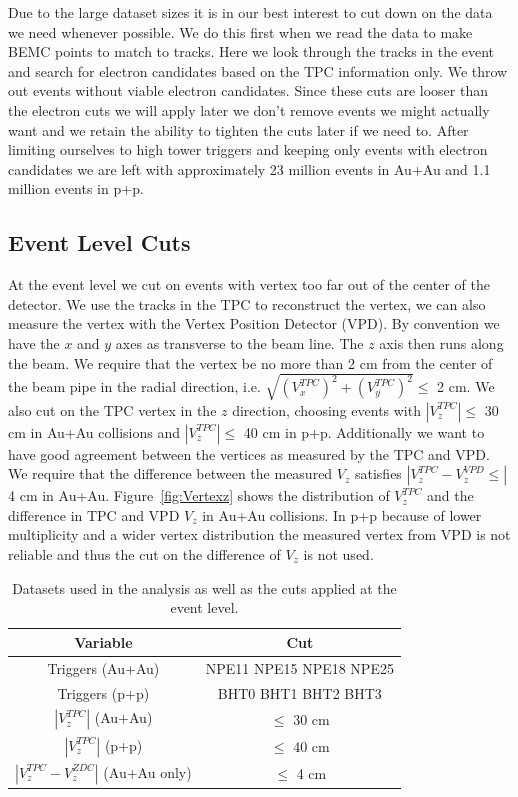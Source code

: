 Due to the large dataset sizes it is in our best interest to cut down on the data we need whenever possible. We do this first when we read the data to make BEMC points to match to tracks. Here we look through the tracks in the event and search for electron candidates based on the TPC information only. We throw out events without viable electron candidates. Since these cuts are looser than the electron cuts we will apply later we don't remove events we might actually want and we retain the ability to tighten the cuts later if we need to. After limiting ourselves to high tower triggers and keeping only events with electron candidates we are left with approximately 23 million events in Au+Au and 1.1 million events in p+p.

\subsection{Event Level Cuts}

At the event level we cut on events with vertex too far out of the center of the detector. We use the tracks in the TPC to reconstruct the vertex, we can also measure the vertex with the Vertex Position Detector (VPD). By convention we have the $x$ and $y$ axes as transverse to the beam line. The $z$ axis then runs along the beam. We require that the vertex be no more than 2 cm from the center of the beam pipe in the radial direction, i.e. $\sqrt{(V_x^{TPC})^2 + (V_y^{TPC})^2} \leq$ 2 cm. We also cut on the TPC vertex in the $z$ direction, choosing events with $|V_z^{TPC}| \leq$ 30 cm in Au+Au collisions and $|V_z^{TPC}| \leq$ 40 cm in p+p. Additionally we want to have good agreement between the vertices as measured by the TPC and VPD. We require that the difference between the measured $V_z$ satisfies $|V_z^{TPC} - V_z^{VPD} \leq|$ 4 cm in Au+Au. Figure~\ref{fig:Vertexz} shows the distribution of $V_z^{TPC}$ and the difference in TPC and VPD $V_z$ in Au+Au collisions. In p+p because of lower multiplicity and a wider vertex distribution the measured vertex from VPD is not reliable and thus the cut on the difference of $V_z$ is not used.

\begin{table}
\centering
\begin{tabular}{|c|c|}
\hline
Variable            & Cut \\
\hline
Triggers (Au+Au)          & NPE11 NPE15 NPE18 NPE25 \\
\hline
Triggers (p+p)          & BHT0 BHT1 BHT2 BHT3 \\
\hline
$|V_z^{TPC}|$  (Au+Au)        & $\leq$ 30 cm \\
\hline
$|V_z^{TPC}|$  (p+p)        & $\leq$ 40 cm \\
\hline
$|V_z^{TPC} - V_z^{ZDC}|$  (Au+Au only)        & $\leq$ 4 cm \\
\hline
\end{tabular}
\caption[Dataset and Event Level Cuts]{Datasets used in the analysis as well as the cuts applied at the event level.}
\label{tab:TPCQual}
\end{table}

